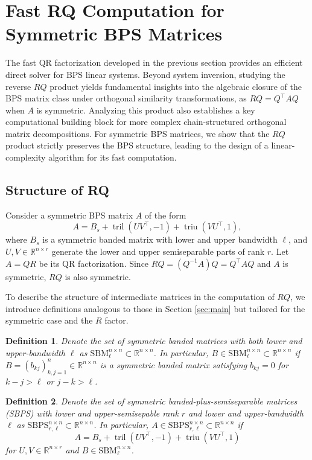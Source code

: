 \documentclass[a4paper,fleqn]{cas-sc}
\newtheorem{definition}{Definition}
\def\bbR{{\mathbb R}}
\def\SBM{{\mathrm{SBM}}_{\ell}^{n \times n}}
\def\SBPS{{\mathrm{SBPS}}_{r,\ell}^{n \times n}}
\def\SBPS{{\mathrm{SBPS}}_{r,\ell}^{n \times n}}
\DeclareMathOperator{\triu}{triu}
\DeclareMathOperator{\tril}{tril}
\begin{document}
\section{Fast RQ Computation for Symmetric BPS Matrices}
\label{sec:fastrq}
The fast QR factorization developed in the previous section provides an efficient direct solver for BPS linear systems. Beyond system inversion, studying the reverse $RQ$ product yields fundamental insights into the algebraic closure of the BPS matrix class under orthogonal similarity transformations, as $RQ = Q^\top A Q$ when $A$ is symmetric. Analyzing this product also establishes a key computational building block for more complex chain-structured orthogonal matrix decompositions. For symmetric BPS matrices, we show that the $RQ$ product strictly preserves the BPS structure, leading to the design of a linear-complexity algorithm for its fast computation.



\subsection{Structure of RQ}

Consider a symmetric BPS matrix $A$ of the form
\begin{equation}\label{express_A_symm}
    A = B_s + \tril(UV^\top, -1) + \triu(VU^\top, 1),
\end{equation}
where $B_s$ is a symmetric banded matrix with lower and upper bandwidth $\ell$, and $U, V \in \mathbb{R}^{n \times r}$ generate the lower and upper semiseparable parts of rank $r$. Let $A=QR$ be its QR factorization. Since $RQ = (Q^{-1}A)Q=Q^\top A Q$ and $A$ is symmetric, $RQ$ is also symmetric.

To describe the structure of intermediate matrices in the computation of $RQ$, we introduce definitions analogous to those in Section \ref{sec:main} but tailored for the symmetric case and the $R$ factor.




\begin{definition}
Denote the set of {\it symmetric banded matrices}  with both lower and upper-bandwidth $\ell$ as $\SBM \subset \bbR^{n \times n}$. In particular, $B \in \SBM \subset \bbR^{n \times n}$ if
 \( B = (b_{kj})_{k,j=1}^n \in \mathbb{R}^{n \times n} \) is a symmetric banded matrix satisfying \( b_{kj}=0 \) for \( k-j>\ell \) or \( j-k>\ell \).
\end{definition}


\begin{definition}
Denote the set of {\it symmetric banded-plus-semiseparable matrices} (SBPS) with lower and upper-semisepable rank $r$ and lower and upper-bandwidth $\ell$  as $\SBPS \subset \bbR^{n \times n}$. In particular, $A \in \SBPS \subset \bbR^{n \times n}$ if
\[
A = B_s + \tril(UV^\top, -1) + \triu(VU^\top, 1)
\]
for \( U, V \in \mathbb{R}^{n\times r} \) and \( B   \in \SBM \).
\end{definition}
\end{document}
